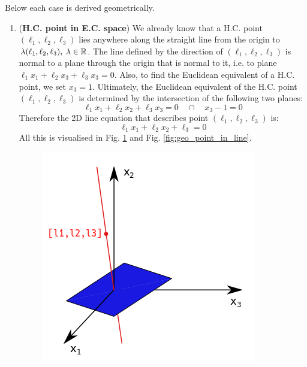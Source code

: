 \documentclass[a4paper]{article}
\begin{document}
Below each case is derived geometrically.
\begin{enumerate}
    \item (\textbf{H.C. point in E.C. space}) We already know that a H.C. point $(\ell_1, \ell_2, \ell_3)$ lies anywhere along the straight line from the origin to $\lambda(\ell_1, \ell_2, \ell_3), \; \lambda \in \mathbb{R}$. The line defined by the direction of $(\ell_1, \ell_2, \ell_3)$ is normal to a plane through the origin that is normal to it, i.e. to plane $\ell_1x_1 + \ell_2x_3 + \ell_3x_3 = 0$. Also, to find the Euclidean equivalent of a H.C. point, we set $x_3=1$. Ultimately, the Euclidean equivalent of the H.C. point $(\ell_1, \ell_2, \ell_3)$ is determined by the intersection of the following two planes:
    \[
    \ell_1x_1 + \ell_2x_2 + \ell_3x_3 = 0 \quad \cap \quad   x_3 - 1 = 0
    \]
    Therefore the 2D line equation that describes point $(\ell_1,\ell_2,\ell_3)$ is:
    \[
        \ell_1x_1 + \ell_2x_2 + \ell_3 = 0 
    \]
    All this is visualised in Fig. \ref{fig:geo_plane_origin} and Fig. \ref{fig:geo_point_in_line}.
\begin{figure}[H]
    \centering
    \begin{minipage}{.4\textwidth}
      \centering
      \includegraphics[width=0.7\linewidth]{img/geo_plane_origin.png}
      \label{fig:geo_plane_origin}
    \end{minipage}%
    \begin{minipage}{.5\textwidth}
      \centering

\end{minipage}
\end{figure}
\end{enumerate}
\end{document}
